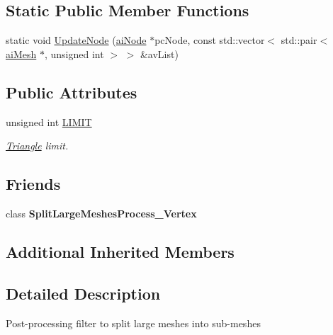\subsection*{Static Public Member Functions}
\begin{DoxyCompactItemize}
\item 
static void \hyperlink{class_assimp_1_1_split_large_meshes_process___triangle_aecf2b7a5950e3ff5d556d24d0aad43a2}{Update\+Node} (\hyperlink{structai_node}{ai\+Node} $\ast$pc\+Node, const std\+::vector$<$ std\+::pair$<$ \hyperlink{structai_mesh}{ai\+Mesh} $\ast$, unsigned int $>$ $>$ \&av\+List)
\end{DoxyCompactItemize}
\subsection*{Public Attributes}
\begin{DoxyCompactItemize}
\item 
\hypertarget{class_assimp_1_1_split_large_meshes_process___triangle_ad44358d6d1e7b4aee61817f56f8c0e85}{unsigned int \hyperlink{class_assimp_1_1_split_large_meshes_process___triangle_ad44358d6d1e7b4aee61817f56f8c0e85}{L\+I\+M\+I\+T}}\label{class_assimp_1_1_split_large_meshes_process___triangle_ad44358d6d1e7b4aee61817f56f8c0e85}

\begin{DoxyCompactList}\small\item\em \hyperlink{class_triangle}{Triangle} limit. \end{DoxyCompactList}\end{DoxyCompactItemize}
\subsection*{Friends}
\begin{DoxyCompactItemize}
\item 
\hypertarget{class_assimp_1_1_split_large_meshes_process___triangle_af32ac9be98db4f38c6d6f8d5f241036a}{class {\bfseries Split\+Large\+Meshes\+Process\+\_\+\+Vertex}}\label{class_assimp_1_1_split_large_meshes_process___triangle_af32ac9be98db4f38c6d6f8d5f241036a}

\end{DoxyCompactItemize}
\subsection*{Additional Inherited Members}


\subsection{Detailed Description}
Post-\/processing filter to split large meshes into sub-\/meshes

